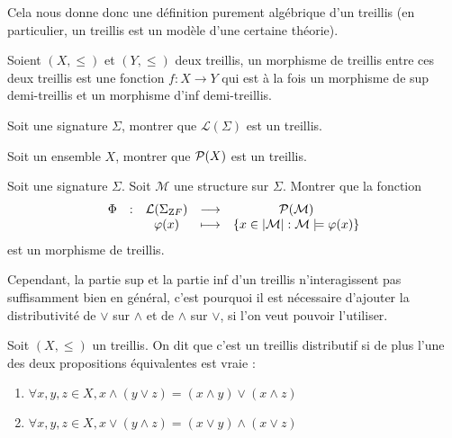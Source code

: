 Cela nous donne donc une définition purement algébrique d'un treillis (en
particulier, un treillis est un modèle d'une certaine théorie).

\begin{definition}
  Soient $(X,\leq)$ et $(Y,\leq)$ deux treillis, un morphisme de treillis entre
  ces deux treillis est une fonction $f : X \to Y$ qui est à la fois un morphisme
  de sup demi-treillis et un morphisme d'inf demi-treillis.
\end{definition}

\begin{exercise}
  Soit une signature $\Sigma$, montrer que $\mathcal L(\Sigma)$ est un treillis.
\end{exercise}

\begin{exercise}
  Soit un ensemble $X$, montrer que $\mathcal{P} (X)$ est un treillis.
\end{exercise}

\begin{exercise}
  Soit une signature $\Sigma$. Soit $\mathcal M$ une structure sur $\Sigma$.
  Montrer que la fonction
  \[\begin{array}{ccccc}
  \Phi & : & \mathcal L(\Sigma_{\mathrm ZF}) & \longrightarrow &
  \mathcal{P}(\mathcal M)\\
  & & \varphi(x) & \longmapsto &
  \{x \in |\mathcal M| : \mathcal M\models \varphi(x)\}
  \end{array}\]
  est un morphisme de treillis.
\end{exercise}

Cependant, la partie sup et la partie inf d'un treillis n'interagissent pas
suffisamment bien en général, c'est pourquoi il est nécessaire d'ajouter la
distributivité de $\lor$ sur $\land$ et de $\land$ sur $\lor$, si l'on veut
pouvoir l'utiliser.

\begin{definition}
  Soit $(X,\leq)$ un treillis. On dit que c'est un treillis distributif si de
  plus l'une des deux propositions équivalentes est vraie :
  \begin{enumerate}[label=(\roman*)]
  \item \label{enum.tr.distr1}
    $\forall x,y,z\in X, x\land (y\lor z) = (x\land y)\lor (x\land z)$
  \item \label{enum.tr.distr2}
    $\forall x,y,z\in X, x\lor (y\land z) = (x\lor y)\land (x\lor z)$
  \end{enumerate}
\end{definition}

